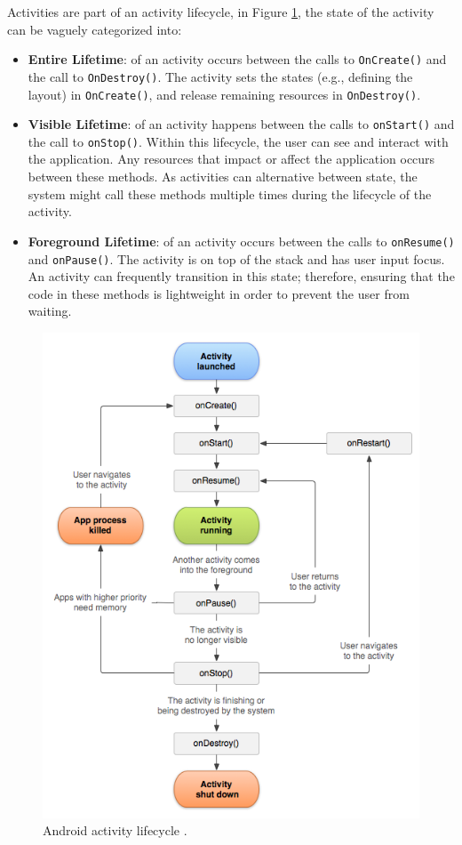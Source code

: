 Activities are part of an activity lifecycle, in Figure \ref{fig:lifecycle}, the state of the activity can be vaguely categorized into:
\begin{itemize}
    \item \textbf{Entire Lifetime}: of an activity occurs between the calls to \verb|OnCreate()| and the call to \verb|OnDestroy()|. The activity sets the states (e.g., defining the layout) in \verb|OnCreate()|, and release remaining resources in \verb|OnDestroy()|.
    \item \textbf{Visible Lifetime}: of an activity happens between the calls to \verb|onStart()| and the call to \verb|onStop()|. Within this lifecycle, the user can see and interact with the application. Any resources that impact or affect the application occurs between these methods. As activities can alternative between state, the system might call these methods multiple times during the lifecycle of the activity.
    \item \textbf{Foreground Lifetime}: of an activity occurs between the calls to \verb|onResume()| and \verb|onPause()|. The activity is on top of the stack and has user input focus. An activity can frequently transition in this state; therefore, ensuring that the code in these methods is lightweight in order to prevent the user from waiting. 
\end{itemize} 

\begin{figure}
    \centering
    \includegraphics[scale=0.6]{images/androidlifecycle.png}
    \caption{Android activity lifecycle \cite{activities}.}
    \label{fig:lifecycle}
\end{figure}

